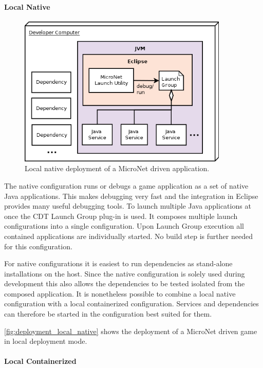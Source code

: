
\paragraph{Local Native}

\begin{figure}
	\centering
	\includegraphics[width=10cm]{images/architecture/DeploymentLocalNative}
	\caption{Local native deployment of a MicroNet driven application.}
	\label{fig:deployment_local_native}
\end{figure}

The native configuration runs or debugs a game application as a set of native
Java applications. This makes debugging very fast and the integration in Eclipse
provides many useful debugging tools. To launch multiple Java applications at
once the CDT Launch Group plug-in is used. It composes multiple launch
configurations into a single configuration. Upon Launch Group execution all
contained applications are individually started. No build step is further needed
for this configuration.

For native configurations it is easiest to run dependencies as stand-alone
installations on the host. Since the native configuration is solely used during
development this also allows the dependencies to be tested isolated from the
composed application. It is nonetheless possible to combine a local native
configuration with a local containerized configuration. Services and
dependencies can therefore be started in the configuration best suited for them.

\autoref{fig:deployment_local_native} shows the deployment of a MicroNet
driven game in local deployment mode.

\paragraph{Local Containerized}

